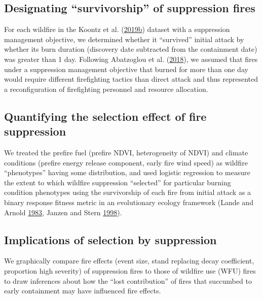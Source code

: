 \documentclass[twoside,12pt,final]{ucthesis-CA2012}
\begin{document}
\begin{ucmainmatter}
\subsection{\texorpdfstring{Designating ``survivorship'' of suppression
fires}{Designating survivorship of suppression fires}}\label{designating-survivorship-of-suppression-fires}

For each wildfire in the Koontz et al.
(\protect\hyperlink{ref-koontz2019a}{2019}\protect\hyperlink{ref-koontz2019a}{b})
dataset with a suppression management objective, we determined whether
it ``survived'' initial attack by whether its burn duration (discovery
date subtracted from the containment date) was greater than 1 day.
Following Abatzoglou et al.
(\protect\hyperlink{ref-abatzoglou2018a}{2018}), we assumed that fires
under a suppression management objective that burned for more than one
day would require different firefighting tactics than direct attack and
thus represented a reconfiguration of firefighting personnel and
resource allocation.

\subsection{Quantifying the selection effect of fire
suppression}\label{quantifying-the-selection-effect-of-fire-suppression}

We treated the prefire fuel (prefire NDVI, heterogeneity of NDVI) and
climate conditions (prefire energy release component, early fire wind
speed) as wildfire ``phenotypes'' having some distribution, and used
logistic regression to measure the extent to which wildfire suppression
``selected'' for particular burning condition phenotypes using the
survivorship of each fire from initial attack as a binary response
fitness metric in an evolutionary ecology framework (Lande and Arnold
\protect\hyperlink{ref-lande1983}{1983}, Janzen and Stern
\protect\hyperlink{ref-janzen1998}{1998}).

\subsection{Implications of selection by
suppression}\label{implications-of-selection-by-suppression}

We graphically compare fire effects (event size, stand replacing decay
coefficient, proportion high severity) of suppression fires to those of
wildfire use (WFU) fires to draw inferences about how the ``lost
contribution'' of fires that succumbed to early containment may have
influenced fire effects.


\end{ucmainmatter}
\end{document}
